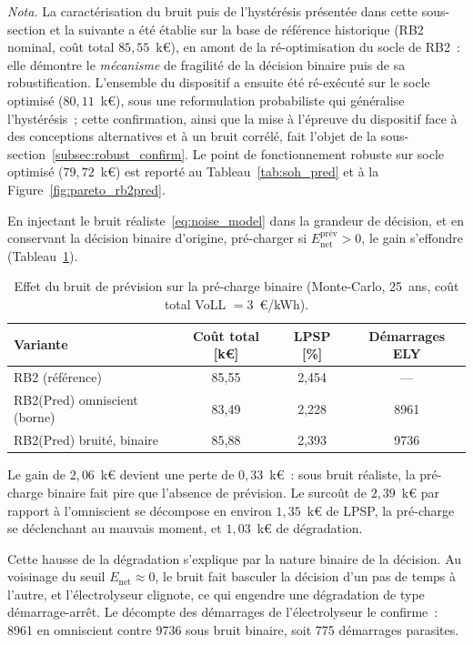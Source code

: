 \emph{Nota.} La caractérisation du bruit puis de l'hystérésis présentée dans cette sous-section et la suivante a été établie sur la base de référence historique (RB2 nominal, coût total $85{,}55$~k€), en amont de la ré-optimisation du socle de RB2~: elle démontre le \emph{mécanisme} de fragilité de la décision binaire puis de sa robustification. L'ensemble du dispositif a ensuite été ré-exécuté sur le socle optimisé ($80{,}11$~k€), sous une reformulation probabiliste qui généralise l'hystérésis~; cette confirmation, ainsi que la mise à l'épreuve du dispositif face à des conceptions alternatives et à un bruit corrélé, fait l'objet de la sous-section~\ref{subsec:robust_confirm}. Le point de fonctionnement robuste sur socle optimisé ($79{,}72$~k€) est reporté au Tableau~\ref{tab:soh_pred} et à la Figure~\ref{fig:pareto_rb2pred}.

En injectant le bruit réaliste~\eqref{eq:noise_model} dans la grandeur de décision, et en conservant la décision binaire d'origine, pré-charger si $E_{\text{net}}^{\text{prév}}>0$, le gain s'effondre (Tableau~\ref{tab:fragility}).

\begin{table}[h!]
\centering
\caption{Effet du bruit de prévision sur la pré-charge binaire (Monte-Carlo, 25~ans, coût total VoLL $=3$~€/kWh).}
\label{tab:fragility}
\begin{tabular}{lccc}
\hline
Variante & Coût total [k€] & LPSP [\%] & Démarrages ELY \\
\hline
RB2 (référence)                 & 85,55 & 2,454 & --- \\
RB2(Pred) omniscient (borne)    & 83,49 & 2,228 & 8961 \\
RB2(Pred) bruité, binaire       & 85,88 & 2,393 & 9736 \\
\hline
\end{tabular}
\end{table}

Le gain de $2{,}06$~k€ devient une perte de $0{,}33$~k€~: sous bruit réaliste, la pré-charge binaire fait pire que l'absence de prévision. Le surcoût de $2{,}39$~k€ par rapport à l'omniscient se décompose en environ $1{,}35$~k€ de LPSP, la pré-charge se déclenchant au mauvais moment, et $1{,}03$~k€ de dégradation.

Cette hausse de la dégradation s'explique par la nature binaire de la décision. Au voisinage du seuil $E_{\text{net}} \approx 0$, le bruit fait basculer la décision d'un pas de temps à l'autre, et l'électrolyseur clignote, ce qui engendre une dégradation de type démarrage-arrêt. Le décompte des démarrages de l'électrolyseur le confirme~: \num{8961} en omniscient contre \num{9736} sous bruit binaire, soit \num{775} démarrages parasites.


